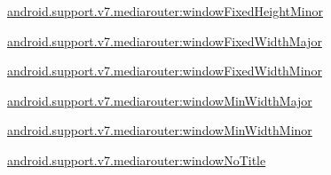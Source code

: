 {\ttfamily \hyperlink{classandroid_1_1support_1_1v7_1_1mediarouter_1_1R_1_1styleable_a9d793fbf38eeb7d1b8c2707b951dcf24}{android.\+support.\+v7.\+mediarouter\+:window\+Fixed\+Height\+Minor}}

{\ttfamily \hyperlink{classandroid_1_1support_1_1v7_1_1mediarouter_1_1R_1_1styleable_a2a286949ebf9182579df1a88e8e294d0}{android.\+support.\+v7.\+mediarouter\+:window\+Fixed\+Width\+Major}}

{\ttfamily \hyperlink{classandroid_1_1support_1_1v7_1_1mediarouter_1_1R_1_1styleable_a291edfbcc421e452ee7b5b1b806fdd68}{android.\+support.\+v7.\+mediarouter\+:window\+Fixed\+Width\+Minor}}

{\ttfamily \hyperlink{classandroid_1_1support_1_1v7_1_1mediarouter_1_1R_1_1styleable_ac2a09f6509c071955e5978f37e5c4633}{android.\+support.\+v7.\+mediarouter\+:window\+Min\+Width\+Major}}

{\ttfamily \hyperlink{classandroid_1_1support_1_1v7_1_1mediarouter_1_1R_1_1styleable_aa71bde585a9d55a3de254d2ece1c876d}{android.\+support.\+v7.\+mediarouter\+:window\+Min\+Width\+Minor}}

{\ttfamily \hyperlink{classandroid_1_1support_1_1v7_1_1mediarouter_1_1R_1_1styleable_a26662431b0c47b968955d940dc4adc24}{android.\+support.\+v7.\+mediarouter\+:window\+No\+Title}}

